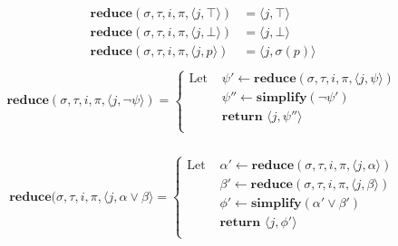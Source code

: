 \documentclass[10pt,a4paper]{article}
\newcommand{\rp}[2]{\ensuremath{\langle #1, #2 \rangle}}
\begin{document}
\begin{align*}
\mathbf{reduce}(\sigma,\tau, i,\pi,\rp{j}{\top}) &= \rp{j}{\top} \\
\mathbf{reduce}(\sigma,\tau, i,\pi,\rp{j}{\bot}) &= \rp{j}{\bot} \\
\mathbf{reduce}(\sigma,\tau, i,\pi,\rp{j}{p}) &= \rp{j}{\sigma(p)} \\
\end{align*}
\begin{align*}
\mathbf{reduce}(\sigma,\tau, i,\pi,\rp{j}{\neg \psi}) = \left\{
\begin{aligned}
\text{Let } &\psi' \leftarrow \mathbf{reduce}(\sigma, \tau, i, \pi, \rp{j}{\psi}) \\
&\psi'' \leftarrow \mathbf{simplify}(\neg \psi') \\
&\textbf{return } \rp{j}{\psi''} \\
\end{aligned} \right. \\
\end{align*}

\begin{align*}
\mathbf{reduce}(\sigma,\tau, i,\pi,\rp{j}{\alpha \vee \beta} = \left\{
\begin{aligned}
\text{Let } &\alpha' \leftarrow \mathbf{reduce}(\sigma, \tau, i, \pi, \rp{j}{\alpha}) \\
&\beta' \leftarrow \mathbf{reduce}(\sigma, \tau, i, \pi, \rp{j}{\beta}) \\
&\phi' \leftarrow \mathbf{simplify}(\alpha' \vee \beta') \\
&\textbf{return } \rp{j}{\phi'} \\
\end{aligned} \right. \\
\end{align*}
\end{document}
